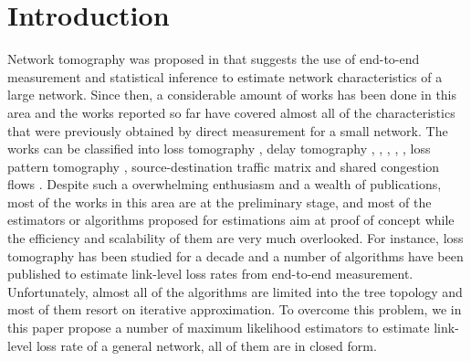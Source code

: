 \documentclass[10pt,twocolumn]{IEEEtran}
\begin{document}
\section{Introduction}


Network tomography was proposed in \cite{YV96} that suggests the use
of end-to-end measurement and statistical inference to estimate
network characteristics of a large network. Since then, a considerable
amount of works has been done in this area and the works reported so
far have covered almost all of the characteristics that were
previously obtained by direct measurement for a small network. The
works can be classified into loss tomography \cite{Duffield2002},
delay tomography \cite{LY03}, \cite{TCN03}, \cite{PDHT02},
\cite{SH03}, \cite{LGN06}, loss pattern tomography \cite{ADV07},
source-destination traffic matrix \cite{LY06} and shared congestion
flows \cite{RKT02}. Despite such a overwhelming enthusiasm and a
wealth of publications, most of the works in this area are at the
preliminary stage, and most of the estimators or algorithms proposed
for estimations aim at proof of concept while the efficiency and
scalability of them are very much overlooked. For instance, loss
tomography has been studied for a decade and a number of algorithms
have been published to estimate link-level loss rates from end-to-end
measurement. Unfortunately, almost all of the algorithms are limited
into the tree topology and most of them resort on iterative
approximation. To overcome this problem, we in this paper propose a
number of maximum likelihood estimators to estimate link-level loss
rate of a general network, all of them are in closed form.
\end{document}
